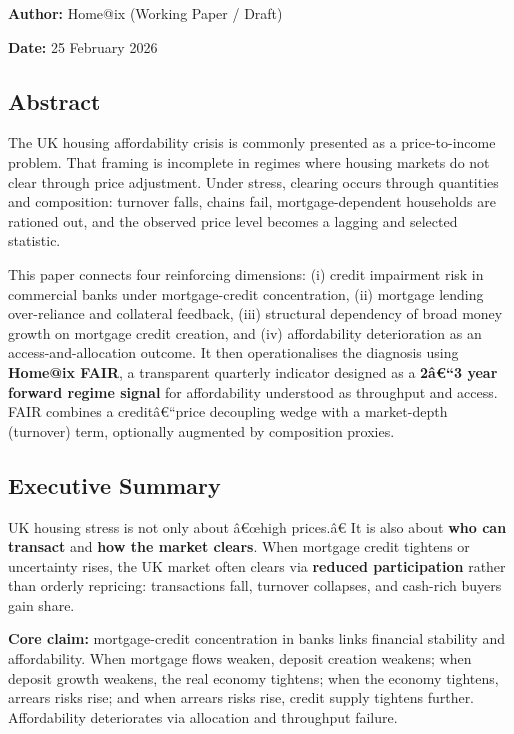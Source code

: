 \textbf{Author:} Home@ix (Working Paper / Draft)

\textbf{Date:} 25 February 2026

\subsection{Abstract}\label{abstract}

The UK housing affordability crisis is commonly presented as a
price-to-income problem. That framing is incomplete in regimes where
housing markets do not clear through price adjustment. Under stress,
clearing occurs through quantities and composition: turnover falls,
chains fail, mortgage-dependent households are rationed out, and the
observed price level becomes a lagging and selected statistic.

This paper connects four reinforcing dimensions: (i) credit impairment
risk in commercial banks under mortgage-credit concentration, (ii)
mortgage lending over-reliance and collateral feedback, (iii) structural
dependency of broad money growth on mortgage credit creation, and (iv)
affordability deterioration as an access-and-allocation outcome. It then
operationalises the diagnosis using \textbf{Home@ix FAIR}, a transparent
quarterly indicator designed as a \textbf{2â€``3 year forward regime
signal} for affordability understood as throughput and access. FAIR
combines a creditâ€``price decoupling wedge with a market-depth
(turnover) term, optionally augmented by composition proxies.

\subsection{Executive Summary}\label{executive-summary}

UK housing stress is not only about â€œhigh prices.â€ It is also about
\textbf{who can transact} and \textbf{how the market clears}. When
mortgage credit tightens or uncertainty rises, the UK market often
clears via \textbf{reduced participation} rather than orderly repricing:
transactions fall, turnover collapses, and cash-rich buyers gain share.

\textbf{Core claim:} mortgage-credit concentration in banks links
financial stability and affordability. When mortgage flows weaken,
deposit creation weakens; when deposit growth weakens, the real economy
tightens; when the economy tightens, arrears risks rise; and when
arrears risks rise, credit supply tightens further. Affordability
deteriorates via allocation and throughput failure.

